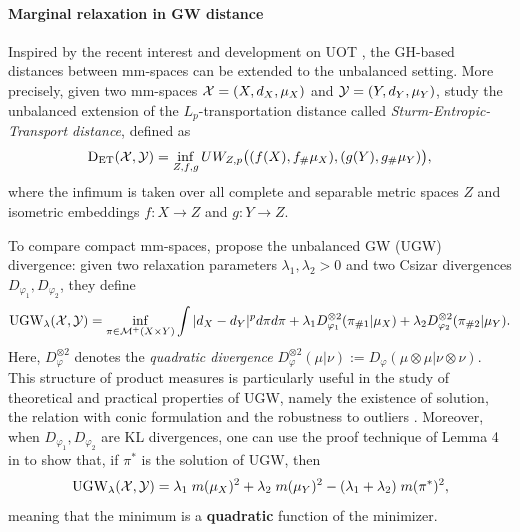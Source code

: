\paragraph{Marginal relaxation in GW distance} Inspired by the recent interest and development
on UOT \citep{Liero18}, the GH-based distances between mm-spaces can be extended to
the unbalanced setting. More precisely, given two mm-spaces
$\mathcal X = (X, d_X, \mu_X)$ and $\mathcal Y = (Y, d_Y, \mu_Y)$, \citep{Ponti20}
study the unbalanced extension of the $L_p$-transportation distance called
\textit{Sturm-Entropic-Transport distance}, defined as
\begin{align}
  \text{D}_{\text{ET}}(\mathcal X, \mathcal Y) =
  \inf_{Z, f, g} UW_{Z, p}\big( (f(X), f_{\#} \mu_X), (g(Y), g_{\#} \mu_Y) \big),
\end{align}
where the infimum is taken over all complete and separable metric spaces $Z$ and
isometric embeddings $f: X \to Z$ and $g: Y \to Z$.

To compare compact mm-spaces,
\citep{Sejourne20} propose the unbalanced GW (UGW) divergence: given two relaxation parameters
$\lambda_1, \lambda_2 > 0$ and two Csizar divergences $D_{\varphi_1}, D_{\varphi_2}$, they define
\begin{align}
  \text{UGW}_{\lambda}(\mathcal X, \mathcal Y) =
  \inf_{ \pi \in \mathcal M^+(X \times Y)} \int |d_X - d_Y|^p d\pi d\pi +
  \lambda_1 D_{\varphi_1}^{\otimes 2}(\pi_{\# 1} | \mu_X) +
  \lambda_2 D_{\varphi_2}^{\otimes 2}(\pi_{\# 2} | \mu_Y).
\end{align}
Here, $D_{\varphi}^{\otimes 2}$ denotes the \textit{quadratic divergence}
$D_{\varphi}^{\otimes 2}(\mu | \nu) := D_{\varphi}(\mu \otimes \mu | \nu \otimes \nu)$.
This structure of product measures is particularly useful in the study of theoretical
and practical properties of UGW, namely the existence of solution,
the relation with conic formulation \citep{Sejourne20} and the robustness to outliers \citep{Tran23}.
Moreover, when $D_{\varphi_1}, D_{\varphi_2}$ are KL divergences, one can use the proof technique of
Lemma 4 in \citep{Khiem20} to show that, if $\pi^*$ is the solution of UGW, then
\begin{align}
  \label{eq:ugw_minimizer_minimum}
  \text{UGW}_{\lambda}(\mathcal X, \mathcal Y) = \lambda_1 \; m(\mu_X)^2 + \lambda_2 \; m(\mu_Y)^2
  - (\lambda_1 + \lambda_2) \; m(\pi^*)^2,
\end{align}
meaning that the minimum is a \textbf{quadratic} function of the minimizer.

